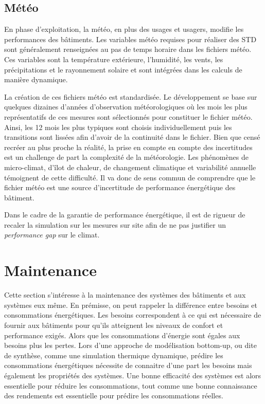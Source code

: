 \subsection{Météo}

En phase d'exploitation, la météo, en plus des usages et usagers, modifie les performances des bâtiments.  Les variables météo requises pour réaliser des STD sont généralement renseignées au pas de temps horaire dans les fichiers météo. Ces variables sont la température extérieure, l'humidité, les vents, les précipitations et le rayonnement solaire et sont intégrées dans les calculs de manière dynamique.

La création de ces fichiers météo est standardisée. Le développement se base sur quelques dizaines d'années d'observation météorologiques où les mois les plus représentatifs de ces mesures sont sélectionnés pour constituer le fichier météo. Ainsi, les 12 mois les plus typiques sont choisis individuellement puis les transitions sont lissées afin d'avoir de la continuité dans le fichier. Bien que censé recréer au plus proche la réalité, la prise en compte en compte des incertitudes est un challenge de part la complexité de la météorologie. Les phénomènes de micro-climat, d'îlot de chaleur, de changement climatique et variabilité annuelle témoignent de cette difficulté. Il va donc de sens commun de comprendre que le fichier météo est une source d'incertitude de performance énergétique des bâtiment.

Dans le cadre de la garantie de performance énergétique, il est de rigueur de recaler la simulation sur les mesures sur site afin de ne pas justifier un \textit{performance gap} sur le climat.

\section{Maintenance}

Cette section s'intéresse à la maintenance des systèmes des bâtiments et aux systèmes eux même. En prémisse, on peut rappeler la différence entre besoins et consommations énergétiques. Les besoins correspondent à ce qui est nécessaire de fournir aux bâtiments pour qu'ils atteignent les niveaux de confort et performance exigés. Alors que les consommations d'énergie sont égales aux besoins plus les pertes. Lors d'une approche de modélisation bottom-up, ou dite de synthèse, comme une simulation thermique dynamique, prédire les consommations énergétiques nécessite de connaitre d'une part les besoins mais également les propriétés des systèmes. Une bonne efficacité des systèmes est alors essentielle pour réduire les consommations, tout comme une bonne connaissance des rendements est essentielle pour prédire les consommations réelles.

